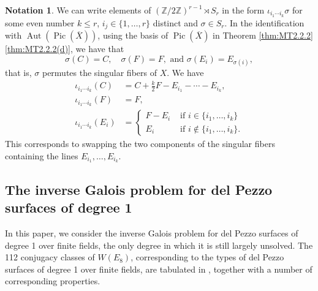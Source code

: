 \documentclass[a4paper, 11pt, reqno]{amsart}
\numberwithin{equation}{section} \numberwithin{figure}{section}
\DeclareMathOperator{\Pic}{Pic}
\DeclareMathOperator{\Aut}{Aut}
\def \Z {{\mathbb Z}}
\newcommand{\ra}{\rightarrow}
\newtheorem{proposition}[lemma]{Proposition}
\theoremstyle{definition}
\newtheorem{notation}[lemma]{Notation}
\numberwithin{lemma}{section}
\begin{document}
\begin{notation}\label{not:W(D7)}
    We can write elements of $(\Z/2\Z)^{r-1} \rtimes S_r$ in the form $\iota_{i_1 \cdots i_k} \sigma$ for some even number $k \leq r$, $i_j \in \{1, \ldots, r\}$ distinct and $\sigma \in S_r$.
In the identification with $\Aut(\Pic(\overline{X}))$, using the basis of $\Pic(\overline{X})$ in Theorem \ref{thm:MT2.2.2}\ref{thm:MT2.2.2(d)}, we have that
\[\sigma(C) = C, \quad \sigma(F) = F, \text{ and } \sigma(E_i) = E_{\sigma(i)},\]
that is, $\sigma$ permutes the singular fibers of $X$. We have \
\begin{align*}
    \iota_{i_1 \cdots i_k}(C) &= C + \frac{k}{2} F - E_{i_1} - \cdots - E_{i_k},\\
    \iota_{i_1 \cdots i_k}(F) &= F,\\
    \iota_{i_1 \cdots i_k}(E_i) &=
\begin{cases}
     F - E_i &\text{ if } i \in \{i_1, \ldots, i_k\}\\
     E_i &\text{ if } i \notin \{i_1, \ldots, i_k\}.
\end{cases}
\end{align*}
This corresponds to swapping the two components of the singular fibers containing the lines $E_{i_1}, \ldots, E_{i_k}$.
\end{notation}

\subsection{The inverse Galois problem for del Pezzo surfaces of degree 1}\label{sec:InverseGaloisProblem}

In this paper, we consider the inverse Galois problem for del Pezzo surfaces of degree 1 over finite fields, the only degree in which it is still largely unsolved. The 112 conjugacy classes of $W(E_8)$, corresponding to the types of del Pezzo surfaces of degree 1 over finite fields, are tabulated in \cite[Table 2]{urabe2}, together with a number of corresponding properties.
\end{document}
